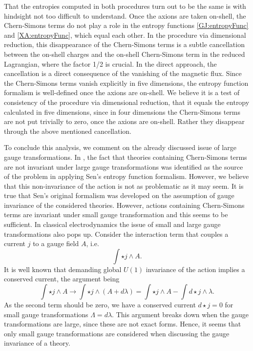 \documentclass[12pt,twoside]{book}
\begin{document}
That the entropies computed in both procedures turn out to be the same is with hindsight not too difficult to understand. Once the axions are taken on-shell, the Chern-Simons terms do not play a role in the entropy functions \eqref{GJ:entropyFunc} and \eqref{XA:entropyFunc}, which equal each other. In the procedure via dimensional reduction, this disappearance of the Chern-Simons terms is a subtle cancellation between the on-shell charges and the on-shell Chern-Simons term in the reduced Lagrangian, where the factor 1/2 is crucial. In the direct approach, the cancellation is a direct consequence of the vanishing of the magnetic flux. Since the Chern-Simons terms vanish explicitly in five dimensions, the entropy function formalism is well-defined once the axions are on-shell. We believe it is a test of consistency of the procedure via dimensional reduction, that it equals the entropy calculated in five dimensions, since in four dimensions the Chern-Simons terms are not put trivially to zero, once the axions are on-shell. Rather they disappear through the above mentioned cancellation.\newline

To conclude this analysis, we comment on the already discussed issue of large gauge transformations. In \cite{Arsiwalla:2008gc}, the fact that theories containing Chern-Simons terms are not invariant under large gauge transformations was identified as the source of the problem in applying Sen's entropy function formalism. However, we believe that this non-invariance of the action is not as problematic as it may seem. It is true that Sen's original formalism was developed on the assumption of gauge invariance of the considered theories. However, actions containing Chern-Simons terms are invariant under small gauge transformation and this seems to be sufficient. In classical electrodynamics the issue of small and large gauge transformations also pops up. Consider the interaction term that couples a current $j$ to a gauge field $A$, i.e.\ \begin{equation}\int \star j \wedge A. \end{equation}
It is well known that demanding global $U(1)$ invariance of the action implies a conserved current, the argument being
\begin{equation}
\int \star j \wedge A \rightarrow \int \star j \wedge (A + d\lambda) = \int \star j \wedge A - \int d \star j \wedge \lambda.
\end{equation}
As the second term should be zero, we have a conserved current $d \star j = 0$ for small gauge transformations $\Lambda = d\lambda$. This argument breaks down when the gauge transformations are large, since these are not exact forms. Hence, it seems that only small gauge transformations are considered when discussing the gauge invariance of a theory.\newline
\end{document}
